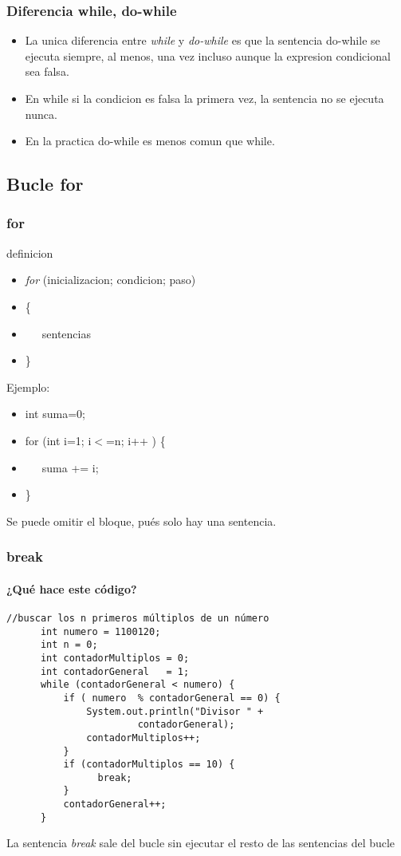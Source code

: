 \documentclass{beamer}
\begin{document}
\begin{frame}
\frametitle{Diferencia while, do-while}
\begin{itemize}[<+->]
\item La unica diferencia entre \emph{while} y \emph{do-while} es que la sentencia \alert{do-while} se ejecuta siempre, al menos, una vez incluso aunque la expresion condicional sea falsa.
\item En \alert{while} si la condicion es falsa la primera vez, la sentencia no se ejecuta nunca.
\item En la practica \alert{do-while} es menos comun que \alert{while}.
\end{itemize}
\pause
\end{frame}



\subsection{Bucle for}
\begin{frame}
\frametitle{for}
\begin{block}{definicion}
\begin{itemize}[<+->]
\item \emph{for }(inicializacion; condicion; paso)
\item \{
\item \ \ \ sentencias
\item \}
\end{itemize}
\end{block}
\pause
\begin{block}{Ejemplo:}
\begin{itemize}[<+->]
\item int suma=0; 
\item for (int i=1; i$<$=n; i++ ) \{
\item \  \ \ suma += i;
\item \}
\end{itemize}
Se puede omitir el bloque, pués solo hay una sentencia.
\pause
\end{block}

\end{frame}

\begin{frame}[fragile]
\frametitle{break}
\framesubtitle{¿Qué hace este código?}

\begin{footnotesize}
\begin{verbatim}
//buscar los n primeros múltiplos de un número
      int numero = 1100120;
      int n = 0;
      int contadorMultiplos = 0;
      int contadorGeneral   = 1;
      while (contadorGeneral < numero) {
          if ( numero  % contadorGeneral == 0) {
              System.out.println("Divisor " +
                       contadorGeneral);
              contadorMultiplos++;
          }
          if (contadorMultiplos == 10) {
                break;
          }
          contadorGeneral++;
      }                     
\end{verbatim}
\pause
La sentencia \emph{break} sale del bucle sin ejecutar el resto de las sentencias del bucle
\end{footnotesize}
\end{frame}
\end{document}
